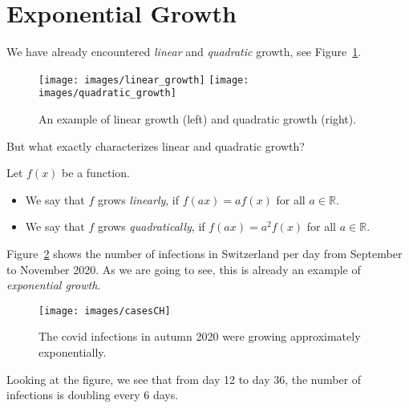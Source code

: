 \section*{Exponential Growth}
We have already encountered \textit{linear} and \textit{quadratic} growth, see Figure~\ref{fig:linear_quadratic_growth}.
\begin{figure}[ht]
	\centering
	\texttt{[image: images/linear\_growth]}\hfill
	\texttt{[image: images/quadratic\_growth]}
	\caption{An example of linear growth (left) and quadratic growth (right).}
	\label{fig:linear_quadratic_growth}
\end{figure}
But what exactly characterizes linear and quadratic growth?
\begin{tcolorbox}
	Let $f\left(x\right)$ be a function.
	\begin{itemize}
		\item We say that $f$ grows \textit{linearly}, if $f\left(ax\right)=af\left(x\right)$ for all $a\in\mathbb R$.
		\item We say that $f$ grows \textit{quadratically}, if $f\left(ax\right)=a^2f\left(x\right)$ for all $a\in\mathbb R$.
	\end{itemize}
\end{tcolorbox}
Figure~\ref{fig:casesCH} shows the number of infections in Switzerland per day from September to November 2020.
As we are going to see, this is already an example of \textit{exponential growth}.
\begin{figure}[ht]
	\centering
	\texttt{[image: images/casesCH]}
	\caption{The covid infections in autumn 2020 were growing approximately exponentially.}
	\label{fig:casesCH}
\end{figure}
Looking at the figure, we see that from day 12 to day 36, the number of infections is doubling every 6 days.